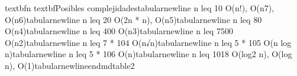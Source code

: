 {}\markdownRendererBackslash{}textbf\markdownRendererLeftBrace{}n\markdownRendererRightBrace{} \markdownRendererAmpersand{} \markdownRendererBackslash{}textbf\markdownRendererLeftBrace{}Posibles complejidades\markdownRendererRightBrace{}\markdownRendererBackslash{}tabularnewline\markdownRendererSoftLineBreak
{}n \markdownRendererBackslash{}leq 10 \markdownRendererAmpersand{} O(n!), O(n\markdownRendererCircumflex{}7), O(n\markdownRendererCircumflex{}6)\markdownRendererBackslash{}tabularnewline\markdownRendererSoftLineBreak
{}n \markdownRendererBackslash{}leq 20 \markdownRendererAmpersand{} O(2\markdownRendererCircumflex{}n * n), O(n\markdownRendererCircumflex{}5)\markdownRendererBackslash{}tabularnewline\markdownRendererSoftLineBreak
{}n \markdownRendererBackslash{}leq 80 \markdownRendererAmpersand{} O(n\markdownRendererCircumflex{}4)\markdownRendererBackslash{}tabularnewline\markdownRendererSoftLineBreak
{}n \markdownRendererBackslash{}leq 400 \markdownRendererAmpersand{} O(n\markdownRendererCircumflex{}3)\markdownRendererBackslash{}tabularnewline\markdownRendererSoftLineBreak
{}n \markdownRendererBackslash{}leq 7500 \markdownRendererAmpersand{} O(n\markdownRendererCircumflex{}2)\markdownRendererBackslash{}tabularnewline\markdownRendererSoftLineBreak
{}n \markdownRendererBackslash{}leq 7 * 10\markdownRendererCircumflex{}4 \markdownRendererAmpersand{} O(n√n)\markdownRendererBackslash{}tabularnewline\markdownRendererSoftLineBreak
{}n \markdownRendererBackslash{}leq 5 * 10\markdownRendererCircumflex{}5 \markdownRendererAmpersand{} O(n log n)\markdownRendererBackslash{}tabularnewline\markdownRendererSoftLineBreak
{}n \markdownRendererBackslash{}leq 5 * 10\markdownRendererCircumflex{}6 \markdownRendererAmpersand{} O(n)\markdownRendererBackslash{}tabularnewline\markdownRendererSoftLineBreak
{}n \markdownRendererBackslash{}leq 10\markdownRendererCircumflex{}\markdownRendererLeftBrace{}18\markdownRendererRightBrace{} \markdownRendererAmpersand{} O(log\markdownRendererCircumflex{}2 n), O(log n), O(1)\markdownRendererBackslash{}tabularnewline\markdownRendererBackslash{}end\markdownRendererLeftBrace{}mdtable2\markdownRendererRightBrace{}
\markdownRendererSectionEnd 
\markdownRendererSectionEnd \markdownRendererDocumentEnd